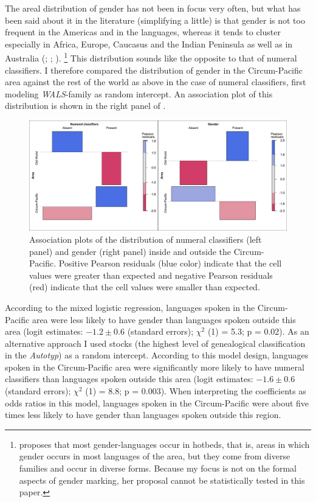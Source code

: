 \documentclass[output=collectionpaper]{langsci/langscibook}
\begin{document}
The areal distribution of gender has not been in focus very often, but what has been said about it in the literature (simplifying a little) is that gender is not too frequent in the Americas and in the  languages, whereas it tends to cluster especially in Africa, Europe, Caucasus and the Indian Peninsula as well as in Australia (\citealt[1--2]{Corbett1991}; \citealt[130--132]{Nichols1992}; \citealt{Corbett2013}).%
\footnote{\citet[130--132]{Nichols1992} proposes that most gender-languages occur in hotbeds, that is, areas in which gender occurs in most languages of the area, but they come from diverse families and occur in diverse forms. Because my focus is not on the formal aspects of gender marking, her proposal cannot be statistically tested in this paper.} %
This distribution sounds like the opposite to that of numeral classifiers. I therefore compared the distribution of gender in the Circum-Pacific area against the rest of the world as above in the case of numeral classifiers, first modeling \textit{WALS}{}-family as random intercept. An association plot of this distribution is shown in the right panel of .

\begin{figure}
\includegraphics[width=\textwidth]{figures/13/Fig5_AssociationPlots_proofs}
\caption{Association plots of the distribution of numeral classifiers (left panel) and gender (right panel) inside and outside the Circum-Pacific. Positive Pearson residuals (blue color) indicate that the cell values were greater than expected and negative Pearson residuals (red) indicate that the cell values were smaller than expected.}
\label{fig:Sinne:5}
\end{figure}

According to the mixed logistic regression, languages spoken in the Circum-Pacific area were less likely to have gender than languages spoken outside this area (logit estimates: $-1.2 \pm 0.6$ (standard errors); $\chi^2$ (1) = 5.3; p = 0.02). As an alternative approach I used stocks (the highest level of genealogical classification in the \textit{Autotyp}) as a random intercept. According to this model design, languages spoken in the Circum-Pacific area were significantly more likely to have numeral classifiers than languages spoken outside this area (logit estimates: $-1.6 \pm 0.6$ (standard errors); $\chi^2$ (1) = 8.8; p = 0.003). When interpreting the coefficients as odds ratios in this model, languages spoken in the Circum-Pacific were about five times less likely to have gender than languages spoken outside this region.
\end{document}
